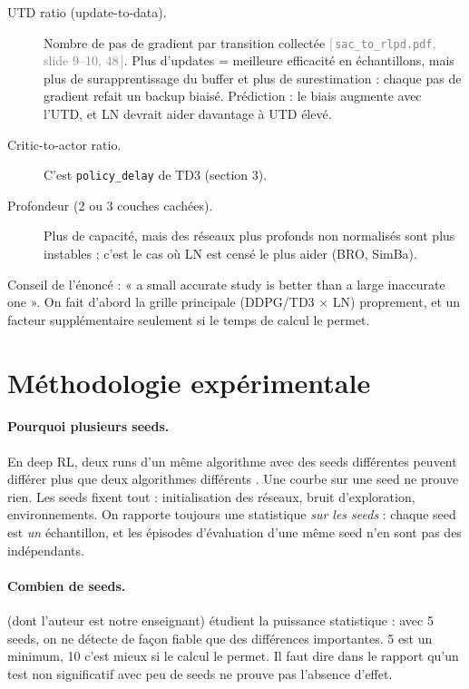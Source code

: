 \documentclass[11pt,a4paper]{article}
\newcommand{\code}[1]{\texttt{#1}}
\newcommand{\slide}[2]{\textcolor{gray}{[\,\code{#1}, slide #2\,]}}
\begin{document}
\begin{description}
  \item[UTD ratio (update-to-data).] Nombre de pas de gradient par transition collectée
    \slide{sac\_to\_rlpd.pdf}{9--10, 48}. Plus d'updates = meilleure efficacité en échantillons, mais
    plus de surapprentissage du buffer et plus de surestimation \citep{li2023overfitting} : chaque
    pas de gradient refait un backup biaisé. Prédiction : le biais augmente avec l'UTD, et LN
    devrait aider davantage à UTD élevé.
  \item[Critic-to-actor ratio.] C'est \code{policy\_delay} de TD3 (section 3).
  \item[Profondeur (2 ou 3 couches cachées).] Plus de capacité, mais des réseaux plus profonds non
    normalisés sont plus instables ; c'est le cas où LN est censé le plus aider (BRO, SimBa).
\end{description}
Conseil de l'énoncé : « a small accurate study is better than a large inaccurate one ». On fait
d'abord la grille principale (DDPG/TD3 $\times$ LN) proprement, et un facteur supplémentaire
seulement si le temps de calcul le permet.

\section{Méthodologie expérimentale}

\paragraph{Pourquoi plusieurs seeds.} En deep RL, deux runs d'un même algorithme avec des seeds
différentes peuvent différer plus que deux algorithmes différents \citep{henderson2018matters}. Une
courbe sur une seed ne prouve rien. Les seeds fixent tout : initialisation des réseaux, bruit
d'exploration, environnements. On rapporte toujours une statistique \emph{sur les seeds} : chaque
seed est \emph{un} échantillon, et les épisodes d'évaluation d'une même seed n'en sont pas des
indépendants.

\paragraph{Combien de seeds.} \citet{colas2018seeds} (dont l'auteur est notre enseignant) étudient la
puissance statistique : avec 5 seeds, on ne détecte de façon fiable que des différences
importantes. 5 est un minimum, 10 c'est mieux si le calcul le permet. Il faut dire dans le rapport
qu'un test non significatif avec peu de seeds ne prouve pas l'absence d'effet.
\end{document}

